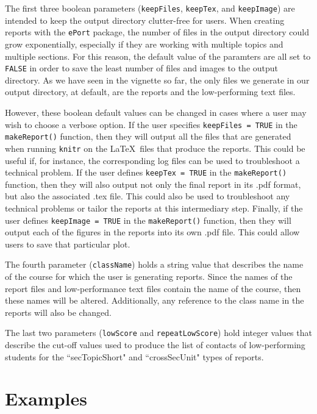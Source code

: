 \documentclass[11pt,a4paper,oldfontcommands,openany]{memoir}
\numberwithin{equation}{section} %
\begin{document}
The first three boolean parameters (\texttt{keepFiles}, \texttt{keepTex}, and \texttt{keepImage}) are intended to keep the output directory clutter-free for users. When creating reports with the \texttt{ePort} package, the number of files in the output directory could grow exponentially, especially if they are working with multiple topics and multiple sections. For this reason, the default value of the paramters are all set to \texttt{FALSE} in order to save the least number of files and images to the output directory. As we have seen in the vignette so far, the only files we generate in our output directory, at default, are the reports and the low-performing text files.

However, these boolean default values can be changed in cases where a user may wish to choose a verbose option. If the user specifies \texttt{keepFiles = TRUE} in the \texttt{makeReport()} function, then they will output all the files that are generated when running \texttt{knitr} on the \LaTeX\  files that produce the reports. This could be useful if, for instance, the corresponding log files can be used to troubleshoot a technical problem. If the user defines \texttt{keepTex = TRUE} in the \texttt{makeReport()} function, then they will also output not only the final report in its .pdf format, but also the associated .tex file. This could also be used to troubleshoot any technical problems or tailor the reports at this intermediary step. Finally, if the user defines \texttt{keepImage = TRUE} in the \texttt{makeReport()} function, then they will output each of the figures in the reports into its own .pdf file. This could allow users to save that particular plot.

The fourth parameter (\texttt{className}) holds a string value that describes the name of the course for which the user is generating reports. Since the names of the report files and low-performance text files contain the name of the course, then these names will be altered. Additionally, any reference to the class name in the reports will also be changed.

The last two parameters (\texttt{lowScore} and \texttt{repeatLowScore}) hold integer values that describe the cut-off values used to produce the list of contacts of low-performing students for the ``secTopicShort" and ``crossSecUnit" types of reports.

\section{Examples}
\end{document}

